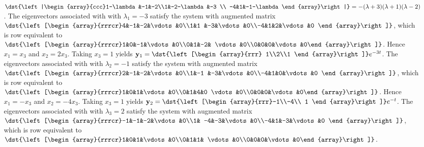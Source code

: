 \documentclass[dvips]{book}
\renewcommand{\exer}[1]{\par\medskip\;\noindent{\color{red}\bf #1.}}
\numberwithin{example}{section}
\numberwithin{equation}{section}
\numberwithin{theorem}{section}
\numberwithin{table}{section}
\numberwithin{figure}{section}
\begin{document}
\exer{10.4.8}
$\dst{\left|\begin{array}{ccc}1-\lambda&-1&-2\\1&-2-\lambda&-3 \\
-4&1&-1-\lambda\end{array}\right|}=-(\lambda+3)(\lambda+1)(\lambda-2)$.
The eigenvectors associated with
 with $\lambda_1=-3$ satisfy the system with  augmented matrix
$\dst{\left[\begin{array}{rrrcr}4&-1&-2&\vdots&0\\1&1
&-3&\vdots&0\\-4&1&2&\vdots&0
\end{array}\right]}$,
which is row equivalent to
$\dst{\left[\begin{array}{rrrcr}1&0&-1&\vdots&0\\0&1&-2&
\vdots&0\\0&0&0&\vdots&0\end{array}\right]}$.
Hence $x_1=x_3$ and $x_2=2x_3$.  Taking $x_3=1$ yields
${\bf y}_1=\dst{\left[\begin{array}{rrr} 1\\2\\1
\end{array}\right]}e^{-3t}$.
The eigenvectors associated with
 with $\lambda_2=-1$ satisfy the system with  augmented matrix
$\dst{\left[\begin{array}{rrrcr}2&-1&-2&\vdots&0\\1&-1
&-3&\vdots&0\\-4&1&0&\vdots&0
\end{array}\right]}$,
which is row equivalent to
$\dst{\left[\begin{array}{rrrcr}1&0&1&\vdots&0\\0&1&4&0
\vdots&0\\0&0&0&\vdots&0\end{array}\right]}$.
Hence $x_1=-x_3$ and $x_2=-4x_3$.  Taking $x_3=1$ yields
${\bf y}_2=\dst{\left[\begin{array}{rrr}-1\\-4\\ 1
\end{array}\right]}e^{-t}$.
The eigenvectors associated with
 with $\lambda_3=2$ satisfy the system with  augmented matrix
$\dst{\left[\begin{array}{rrrcr}-1&-1&-2&\vdots&0\\1&
-4&-3&\vdots&0\\-4&1&-3&\vdots&0
\end{array}\right]}$,
which is row equivalent to
$\dst{\left[\begin{array}{rrrcr}1&0&1&\vdots&0\\0&1&1&
\vdots&0\\0&0&0&\vdots&0\end{array}\right]}$.
\end{document}
